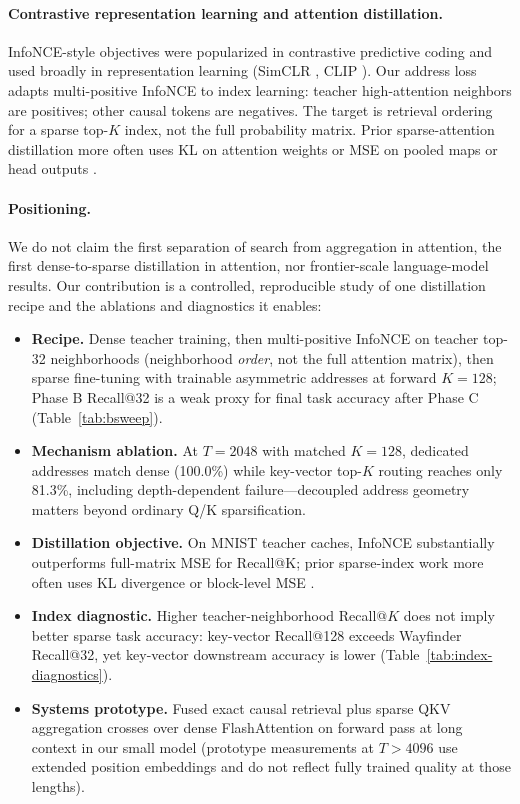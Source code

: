 \documentclass{article}
\begin{document}
\paragraph{Contrastive representation learning and attention distillation.}
InfoNCE-style objectives were popularized in contrastive predictive coding \cite{oord2018cpc} and used broadly in representation learning (SimCLR \cite{chen2020simclr}, CLIP \cite{radford2021clip}). Our address loss adapts multi-positive InfoNCE to index learning: teacher high-attention neighbors are positives; other causal tokens are negatives. The target is retrieval ordering for a sparse top-$K$ index, not the full probability matrix. Prior sparse-attention distillation more often uses KL on attention weights \cite{deepseek2025v32,sun2022lha} or MSE on pooled maps or head outputs \cite{gao2024seerattention,sundarapandiyan2025fsa}.

\paragraph{Positioning.}
We do not claim the first separation of search from aggregation in attention, the first dense-to-sparse distillation in attention, nor frontier-scale language-model results. Our contribution is a controlled, reproducible study of one distillation recipe and the ablations and diagnostics it enables:
\begin{itemize}
    \item \textbf{Recipe.} Dense teacher training, then multi-positive InfoNCE on teacher top-32 neighborhoods (neighborhood \emph{order}, not the full attention matrix), then sparse fine-tuning with trainable asymmetric addresses at forward $K{=}128$; Phase B Recall@32 is a weak proxy for final task accuracy after Phase C (Table~\ref{tab:bsweep}).
    \item \textbf{Mechanism ablation.} At $T{=}2048$ with matched $K{=}128$, dedicated addresses match dense (100.0\%) while key-vector top-$K$ routing reaches only 81.3\%, including depth-dependent failure---decoupled address geometry matters beyond ordinary Q/K sparsification.
    \item \textbf{Distillation objective.} On MNIST teacher caches, InfoNCE substantially outperforms full-matrix MSE for Recall@K; prior sparse-index work more often uses KL divergence or block-level MSE \cite{deepseek2025v32,gao2024seerattention,sundarapandiyan2025fsa}.
    \item \textbf{Index diagnostic.} Higher teacher-neighborhood Recall@$K$ does not imply better sparse task accuracy: key-vector Recall@128 exceeds Wayfinder Recall@32, yet key-vector downstream accuracy is lower (Table~\ref{tab:index-diagnostics}).
    \item \textbf{Systems prototype.} Fused exact causal retrieval plus sparse QKV aggregation crosses over dense FlashAttention on forward pass at long context in our small model (prototype measurements at $T{>}4096$ use extended position embeddings and do not reflect fully trained quality at those lengths).
\end{itemize}
\end{document}
